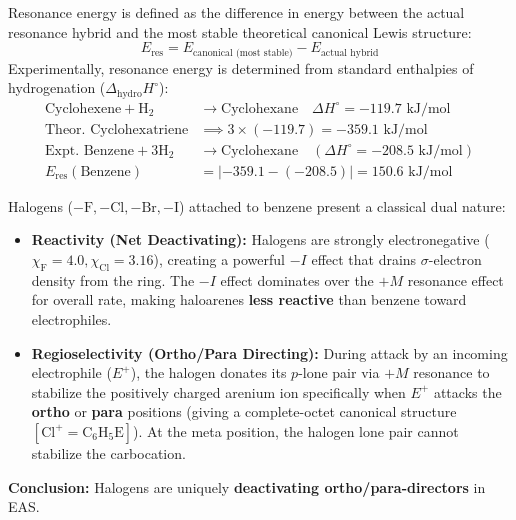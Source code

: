 \documentclass[10pt,twoside,openright]{book}
\begin{document}
\begin{formulabox}
Resonance energy is defined as the difference in energy between the actual resonance hybrid and the most stable theoretical canonical Lewis structure:
\begin{equation}
  E_{\mathrm{res}} = E_{\text{canonical (most stable)}} - E_{\text{actual hybrid}}
\end{equation}
Experimentally, resonance energy is determined from standard enthalpies of hydrogenation ($\Delta_{\mathrm{hydro}}H^\circ$):
\begin{equation}
  \begin{aligned}
    \text{Cyclohexene} + \mathrm{H_2} &\to \text{Cyclohexane} \quad \Delta H^\circ = -119.7\text{ kJ/mol}\\
    \text{Theor. Cyclohexatriene} &\implies 3 \times (-119.7) = -359.1\text{ kJ/mol}\\
    \text{Expt. Benzene} + 3\mathrm{H_2} &\to \text{Cyclohexane} \quad (\Delta H^\circ = -208.5\text{ kJ/mol})\\
    E_{\mathrm{res}}(\text{Benzene}) &= |-359.1 - (-208.5)| = 150.6\text{ kJ/mol}
  \end{aligned}
\end{equation}
\end{formulabox}

\begin{trapbox}
Halogens ($-\mathrm{F}, -\mathrm{Cl}, -\mathrm{Br}, -\mathrm{I}$) attached to benzene present a classical dual nature:
\begin{itemize}
  \item \textbf{Reactivity (Net Deactivating):} Halogens are strongly electronegative ($\chi_{\mathrm{F}} = 4.0, \chi_{\mathrm{Cl}} = 3.16$), creating a powerful $-I$ effect that drains $\sigma$-electron density from the ring. The $-I$ effect dominates over the $+M$ resonance effect for overall rate, making haloarenes \textbf{less reactive} than benzene toward electrophiles.
  \item \textbf{Regioselectivity (Ortho/Para Directing):} During attack by an incoming electrophile ($E^+$), the halogen donates its $p$-lone pair via $+M$ resonance to stabilize the positively charged arenium ion specifically when $E^+$ attacks the \textbf{ortho} or \textbf{para} positions (giving a complete-octet canonical structure $[\mathrm{Cl}^+=\mathrm{C_6H_5E}]$). At the meta position, the halogen lone pair cannot stabilize the carbocation.
\end{itemize}
\textbf{Conclusion:} Halogens are uniquely \textbf{deactivating ortho/para-directors} in EAS.
\end{trapbox}
\end{document}
